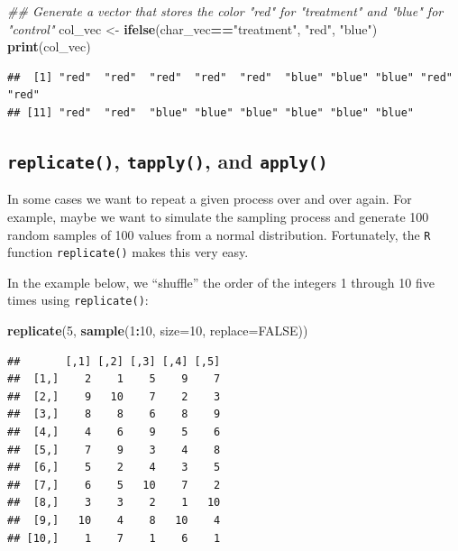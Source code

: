 \documentclass[]{book}
\newenvironment{Shaded}{\begin{snugshade}}{\end{snugshade}}
\newcommand{\CommentTok}[1]{\textcolor[rgb]{0.56,0.35,0.01}{\textit{#1}}}
\newcommand{\DataTypeTok}[1]{\textcolor[rgb]{0.13,0.29,0.53}{#1}}
\newcommand{\DecValTok}[1]{\textcolor[rgb]{0.00,0.00,0.81}{#1}}
\newcommand{\KeywordTok}[1]{\textcolor[rgb]{0.13,0.29,0.53}{\textbf{#1}}}
\newcommand{\NormalTok}[1]{#1}
\newcommand{\OperatorTok}[1]{\textcolor[rgb]{0.81,0.36,0.00}{\textbf{#1}}}
\newcommand{\OtherTok}[1]{\textcolor[rgb]{0.56,0.35,0.01}{#1}}
\newcommand{\StringTok}[1]{\textcolor[rgb]{0.31,0.60,0.02}{#1}}
\begin{document}
\begin{Shaded}
\begin{Highlighting}[]
\CommentTok{## Generate a vector that stores the color "red" for "treatment" and "blue" for "control"}
\NormalTok{col_vec <-}\StringTok{ }\KeywordTok{ifelse}\NormalTok{(char_vec}\OperatorTok{==}\StringTok{"treatment"}\NormalTok{, }\StringTok{"red"}\NormalTok{, }\StringTok{"blue"}\NormalTok{)}
\KeywordTok{print}\NormalTok{(col_vec)}
\end{Highlighting}
\end{Shaded}

\begin{verbatim}
##  [1] "red"  "red"  "red"  "red"  "red"  "blue" "blue" "blue" "red"  "red" 
## [11] "red"  "red"  "blue" "blue" "blue" "blue" "blue" "blue"
\end{verbatim}

\hypertarget{replicate-tapply-and-apply}{%
\subsection{\texorpdfstring{\texttt{replicate()}, \texttt{tapply()}, and \texttt{apply()}}{replicate(), tapply(), and apply()}}\label{replicate-tapply-and-apply}}

In some cases we want to repeat a given process over and over again. For example, maybe we want to simulate the sampling process and generate 100 random samples of 100 values from a normal distribution. Fortunately, the \texttt{R} function \texttt{replicate()} makes this very easy.

In the example below, we ``shuffle'' the order of the integers 1 through 10 five times using \texttt{replicate()}:

\begin{Shaded}
\begin{Highlighting}[]
\KeywordTok{replicate}\NormalTok{(}\DecValTok{5}\NormalTok{, }\KeywordTok{sample}\NormalTok{(}\DecValTok{1}\OperatorTok{:}\DecValTok{10}\NormalTok{, }\DataTypeTok{size=}\DecValTok{10}\NormalTok{, }\DataTypeTok{replace=}\OtherTok{FALSE}\NormalTok{))}
\end{Highlighting}
\end{Shaded}

\begin{verbatim}
##       [,1] [,2] [,3] [,4] [,5]
##  [1,]    2    1    5    9    7
##  [2,]    9   10    7    2    3
##  [3,]    8    8    6    8    9
##  [4,]    4    6    9    5    6
##  [5,]    7    9    3    4    8
##  [6,]    5    2    4    3    5
##  [7,]    6    5   10    7    2
##  [8,]    3    3    2    1   10
##  [9,]   10    4    8   10    4
## [10,]    1    7    1    6    1
\end{verbatim}
\end{document}
